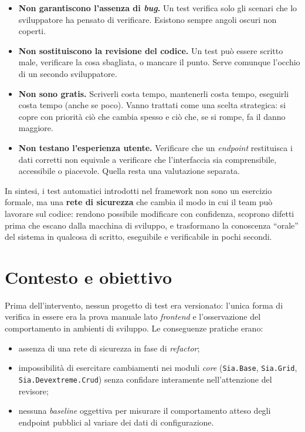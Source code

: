 \begin{itemize}
    \item \textbf{Non garantiscono l'assenza di \emph{bug}.} Un test verifica solo gli scenari che lo sviluppatore ha pensato di verificare. Esistono sempre angoli oscuri non coperti.
    \item \textbf{Non sostituiscono la revisione del codice.} Un test può essere scritto male, verificare la cosa sbagliata, o mancare il punto. Serve comunque l'occhio di un secondo sviluppatore.
    \item \textbf{Non sono gratis.} Scriverli costa tempo, mantenerli costa tempo, eseguirli costa tempo (anche se poco). Vanno trattati come una scelta strategica: si copre con priorità ciò che cambia spesso e ciò che, se si rompe, fa il danno maggiore.
    \item \textbf{Non testano l'esperienza utente.} Verificare che un \emph{endpoint} restituisca i dati corretti non equivale a verificare che l'interfaccia sia comprensibile, accessibile o piacevole. Quella resta una valutazione separata.
\end{itemize}

In sintesi, i test automatici introdotti nel framework non sono un esercizio formale, ma una \textbf{rete di sicurezza} che cambia il modo in cui il team può lavorare sul codice: rendono possibile modificare con confidenza, scoprono difetti prima che escano dalla macchina di sviluppo, e trasformano la conoscenza ``orale'' del sistema in qualcosa di scritto, eseguibile e verificabile in pochi secondi.

\section{Contesto e obiettivo}

Prima dell'intervento, nessun progetto di test era versionato: l'unica forma di verifica in essere era la prova manuale lato \emph{frontend} e l'osservazione del comportamento in ambienti di sviluppo. Le conseguenze pratiche erano:
\begin{itemize}
    \item assenza di una rete di sicurezza in fase di \emph{refactor};
    \item impossibilità di esercitare cambiamenti nei moduli \emph{core} (\texttt{Sia.Base}, \texttt{Sia.Grid}, \texttt{Sia.Devextreme.Crud}) senza confidare interamente nell'attenzione del revisore;
    \item nessuna \emph{baseline} oggettiva per misurare il comportamento atteso degli endpoint pubblici al variare dei dati di configurazione.
\end{itemize}

